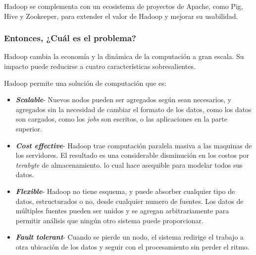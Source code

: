Hadoop se complementa con un ecosistema de proyectos de Apache, como Pig\cite{online_ibm_meaning_pig}, Hive\cite{online_ibm_meaning_hive} y Zookeeper\cite{online_ibm_meaning_zookeeper}, para extender el valor de Hadoop y mejorar su usabilidad.


\subsubsection*{Entonces, ¿Cuál es el problema?}

Hadoop cambia la economía y la dinámica de la computación a gran escala. Su impacto puede reducirse a cuatro características sobresalientes.

Hadoop permite una solución de computación que es:

\begin{itemize}
	\item \textbf{\textit{Scalable}}- Nuevos nodos pueden ser agregados según sean necesarios, y agregados sin la necesidad de cambiar el formato de los datos, como los datos son cargados, como los \textit{jobs} son escritos, o las aplicaciones en la parte superior.
	
	\item \textbf{\textit{Cost effective}}- Hadoop trae computación paralela masiva a las maquinas de los servidores. El resultado es una considerable disminución en los costos por \textit{terabyte} de almacenamiento. lo cual hace asequible para modelar todos sus datos.
	
	\item \textbf{\textit{Flexible}}- Hadoop no tiene esquema, y puede absorber cualquier tipo de datos, estructurados o no, desde cualquier numero de fuentes. Los datos de múltiples fuentes pueden ser unidos y se agregan arbitrariamente para permitir análisis que ningún otro sistema puede proporcionar.
	
	\item \textbf{\textit{Fault tolerant}}- Cuando se pierde un nodo, el sistema redirige el trabajo a otra ubicación de los datos y seguir con el procesamiento sin perder el ritmo.
\end{itemize}




		